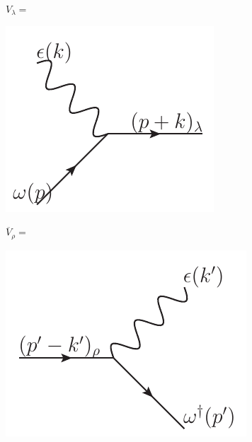 \begin{center}
$V_\lambda = $
\begin{minipage}{2in}
   \includegraphics[scale=0.7]{eps/V-lambda} 
\end{minipage}
\hspace{5em}
$\overline{V}_\rho = $
\begin{minipage}{1.8in}
   \includegraphics[scale=0.7]{eps/V-bar-rho} 
\end{minipage}



\end{center}
